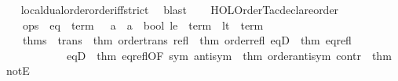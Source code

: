 \begin{isabellebody}
%
\isadelimproof
\ \ %
\endisadelimproof
%
\isatagproof
{}\isamarkupfalse%
\ local{\isachardot}{\kern0pt}dual{\isacharunderscore}{\kern0pt}order{\isachardot}{\kern0pt}order{\isacharunderscore}{\kern0pt}iff{\isacharunderscore}{\kern0pt}strict\ \isamarkupfalse%
\ blast%
\endisatagproof
{\isafoldproof}%
%
\isadelimproof
\isanewline
%
\endisadelimproof
%
\isadelimML
\isanewline
%
\endisadelimML
%
\isatagML
{}\isamarkupfalse%
\ {\isacartoucheopen}\isanewline
\ \ HOL{\isacharunderscore}{\kern0pt}Order{\isacharunderscore}{\kern0pt}Tac{\isachardot}{\kern0pt}declare{\isacharunderscore}{\kern0pt}order\ {\isacharbraceleft}{\kern0pt}\isanewline
\ \ \ \ ops\ {\isacharequal}{\kern0pt}\ {\isacharbraceleft}{\kern0pt}eq\ {\isacharequal}{\kern0pt}\ {\isacharat}{\kern0pt}{\isacharbraceleft}{\kern0pt}term\ {\isasymopen}{\isacharparenleft}{\kern0pt}{\isacharequal}{\kern0pt}{\isacharparenright}{\kern0pt}\ {\isacharcolon}{\kern0pt}{\isacharcolon}{\kern0pt}\ {\isacharprime}{\kern0pt}a\ {\isasymRightarrow}\ {\isacharprime}{\kern0pt}a\ {\isasymRightarrow}\ bool{\isasymclose}{\isacharbraceright}{\kern0pt}{\isacharcomma}{\kern0pt}\ le\ {\isacharequal}{\kern0pt}\ {\isacharat}{\kern0pt}{\isacharbraceleft}{\kern0pt}term\ {\isasymopen}{\isacharparenleft}{\kern0pt}{\isasymle}{\isacharparenright}{\kern0pt}{\isasymclose}{\isacharbraceright}{\kern0pt}{\isacharcomma}{\kern0pt}\ lt\ {\isacharequal}{\kern0pt}\ {\isacharat}{\kern0pt}{\isacharbraceleft}{\kern0pt}term\ {\isasymopen}{\isacharparenleft}{\kern0pt}{\isacharless}{\kern0pt}{\isacharparenright}{\kern0pt}{\isasymclose}{\isacharbraceright}{\kern0pt}{\isacharbraceright}{\kern0pt}{\isacharcomma}{\kern0pt}\isanewline
\ \ \ \ thms\ {\isacharequal}{\kern0pt}\ {\isacharbraceleft}{\kern0pt}trans\ {\isacharequal}{\kern0pt}\ {\isacharat}{\kern0pt}{\isacharbraceleft}{\kern0pt}thm\ order{\isacharunderscore}{\kern0pt}trans{\isacharbraceright}{\kern0pt}{\isacharcomma}{\kern0pt}\ refl\ {\isacharequal}{\kern0pt}\ {\isacharat}{\kern0pt}{\isacharbraceleft}{\kern0pt}thm\ order{\isacharunderscore}{\kern0pt}refl{\isacharbraceright}{\kern0pt}{\isacharcomma}{\kern0pt}\ eqD{}\ {\isacharequal}{\kern0pt}\ {\isacharat}{\kern0pt}{\isacharbraceleft}{\kern0pt}thm\ eq{\isacharunderscore}{\kern0pt}refl{\isacharbraceright}{\kern0pt}{\isacharcomma}{\kern0pt}\isanewline
\ \ \ \ \ \ \ \ \ \ \ \ eqD{}\ {\isacharequal}{\kern0pt}\ {\isacharat}{\kern0pt}{\isacharbraceleft}{\kern0pt}thm\ eq{\isacharunderscore}{\kern0pt}refl{\isacharbrackleft}{\kern0pt}OF\ sym{\isacharbrackright}{\kern0pt}{\isacharbraceright}{\kern0pt}{\isacharcomma}{\kern0pt}\ antisym\ {\isacharequal}{\kern0pt}\ {\isacharat}{\kern0pt}{\isacharbraceleft}{\kern0pt}thm\ order{\isacharunderscore}{\kern0pt}antisym{\isacharbraceright}{\kern0pt}{\isacharcomma}{\kern0pt}\ contr\ {\isacharequal}{\kern0pt}\ {\isacharat}{\kern0pt}{\isacharbraceleft}{\kern0pt}thm\ notE{\isacharbraceright}{\kern0pt}{\isacharbraceright}{\kern0pt}{\isacharcomma}{\kern0pt}\isanewline

\end{isabellebody}
